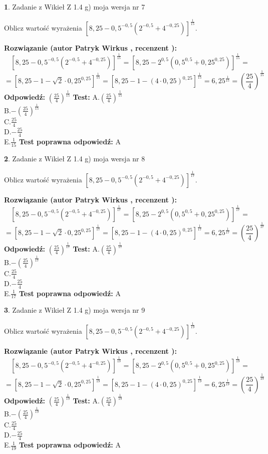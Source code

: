 \documentclass[12pt, a4paper]{article}
\theoremstyle{definition} %
\newtheorem{zad}{}
\newcommand{\zadStart}[1]{\begin{zad}#1\newline}
\newcommand{\zadStop}{\end{zad}}
\newcommand{\rozwStart}[2]{\noindent \textbf{Rozwiązanie (autor #1 , recenzent #2): }\newline}
\newcommand{\rozwStop}{\newline}
\newcommand{\odpStart}{\noindent \textbf{Odpowiedź:}\newline}
\newcommand{\odpStop}{\newline}
\newcommand{\testStart}{\noindent \textbf{Test:}\newline}
\newcommand{\testStop}{\newline}
\newcommand{\kluczStart}{\noindent \textbf{Test poprawna odpowiedź:}\newline}
\newcommand{\kluczStop}{\newline}
\begin{document}
\zadStart{Zadanie z Wikieł Z 1.4 g) moja wersja nr 7}

Oblicz wartość wyrażenia $[8,25-0,5^{-0,5}(2^{-0,5}+4^{-0,25})]^{\frac{1}{15}}$.
\zadStop
\rozwStart{Patryk Wirkus}{}
$$[8,25-0,5^{-0,5}(2^{-0,5}+4^{-0,25})]^{\frac{1}{15}} = [8,25-2^{0,5}(0,5^{0,5}+0,25^{0,25})]^{\frac{1}{15}} =$$
$$=[8,25 - 1 - \sqrt{2} \cdot 0,25^{0,25}]^{\frac{1}{15}} = [8,25 - 1 - (4\cdot 0,25)^{0,25}]^{\frac{1}{15}} = 6,25^{\frac{1}{15}} = (\frac{25}{4})^{\frac{1}{15}}$$
\rozwStop
\odpStart
$(\frac{25}{4})^{\frac{1}{15}}$
\odpStop
\testStart
A.$(\frac{25}{4})^{\frac{1}{15}}$\\ B.$-(\frac{25}{4})^{\frac{1}{15}}$\\ C.$\frac{25}{4}$\\ D.$-\frac{25}{4}$\\ E.$\frac{1}{15}$
\testStop
\kluczStart
A
\kluczStop



\zadStart{Zadanie z Wikieł Z 1.4 g) moja wersja nr 8}

Oblicz wartość wyrażenia $[8,25-0,5^{-0,5}(2^{-0,5}+4^{-0,25})]^{\frac{1}{17}}$.
\zadStop
\rozwStart{Patryk Wirkus}{}
$$[8,25-0,5^{-0,5}(2^{-0,5}+4^{-0,25})]^{\frac{1}{17}} = [8,25-2^{0,5}(0,5^{0,5}+0,25^{0,25})]^{\frac{1}{17}} =$$
$$=[8,25 - 1 - \sqrt{2} \cdot 0,25^{0,25}]^{\frac{1}{17}} = [8,25 - 1 - (4\cdot 0,25)^{0,25}]^{\frac{1}{17}} = 6,25^{\frac{1}{17}} = (\frac{25}{4})^{\frac{1}{17}}$$
\rozwStop
\odpStart
$(\frac{25}{4})^{\frac{1}{17}}$
\odpStop
\testStart
A.$(\frac{25}{4})^{\frac{1}{17}}$\\ B.$-(\frac{25}{4})^{\frac{1}{17}}$\\ C.$\frac{25}{4}$\\ D.$-\frac{25}{4}$\\ E.$\frac{1}{17}$
\testStop
\kluczStart
A
\kluczStop



\zadStart{Zadanie z Wikieł Z 1.4 g) moja wersja nr 9}

Oblicz wartość wyrażenia $[8,25-0,5^{-0,5}(2^{-0,5}+4^{-0,25})]^{\frac{1}{19}}$.
\zadStop
\rozwStart{Patryk Wirkus}{}
$$[8,25-0,5^{-0,5}(2^{-0,5}+4^{-0,25})]^{\frac{1}{19}} = [8,25-2^{0,5}(0,5^{0,5}+0,25^{0,25})]^{\frac{1}{19}} =$$
$$=[8,25 - 1 - \sqrt{2} \cdot 0,25^{0,25}]^{\frac{1}{19}} = [8,25 - 1 - (4\cdot 0,25)^{0,25}]^{\frac{1}{19}} = 6,25^{\frac{1}{19}} = (\frac{25}{4})^{\frac{1}{19}}$$
\rozwStop
\odpStart
$(\frac{25}{4})^{\frac{1}{19}}$
\odpStop
\testStart
A.$(\frac{25}{4})^{\frac{1}{19}}$\\ B.$-(\frac{25}{4})^{\frac{1}{19}}$\\ C.$\frac{25}{4}$\\ D.$-\frac{25}{4}$\\ E.$\frac{1}{19}$
\testStop
\kluczStart
A
\kluczStop
\end{document}

